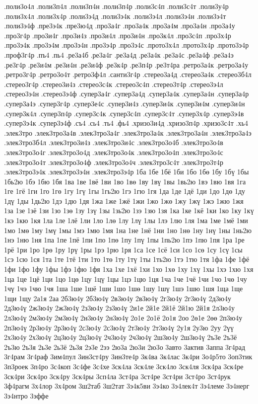 {.поли3о4л
.поли3п4л
.поли3п4н
.поли3п4р
.поли3с4п
.поли3с4т
.поли3у4р
.поли3х4л
.поли3х4р
.поли3э4д
.поли3э4к
.поли3э4л
.поли3э4н
.поли3э4т
.поли3э4ф
.пре3э4к
.пре3ю4д
.про3а4г
.про3а4к
.про3а4м
.про3а4н
.про3а4у
.про3г4р
.про3и4г
.про3и4з
.про3и4л
.про3и4н
.про3к4л
.про3с4п
.про3х4р
.про3э4к
.про3э4м
.про3э4н
.про3э4р
.про3э4с
.прото3х4л
.прото3х4р
.прото3э4р
.проф3г4р
.пъ4
.пь4
.ре3а4б
.ре3а4г
.ре3а4д
.ре3а4к
.ре3а4с
.ре3а4ф
.ре3а4э
.ре3г4р
.ре3и4м
.ре3и4н
.ре3и4ф
.ре3к4р
.ре3п4р
.ре3т4ра
.ретро3а4к
.ретро3а4у
.ретро3г4р
.ретро3о4т
.ретро3ф4л
.санти3г4р
.стерео3а4д
.стерео3а4к
.стерео3б4л
.стерео3г4р
.стерео3и4з
.стерео3с4к
.стерео3с4п
.стерео3т4р
.стерео3э4л
.стерео3э4н
.стерео3э4ф
.супер3а4г
.супер3а4д
.супер3а4к
.супер3а4н
.супер3а4р
.супер3а4э
.супер3г4р
.супер3е4с
.супер3и4з
.супер3и4к
.супер3и4м
.супер3и4н
.супер3к4л
.супер3п4р
.супер3с4к
.супер3с4п
.супер3с4т
.супер3х4р
.супер3э4в
.супер3э4к
.супер3э4ф
.съ4
.сь4
.ть4
.фь4
.хризо3и4д
.хризо3п4р
.хризо3с4т
.хь4
.элек3тро
.элек3тро3а4в
.элек3тро3а4г
.элек3тро3а4к
.элек3тро3а4н
.элек3тро3а4э
.элек3тро3б4л
.элек3тро3и4з
.элек3тро3и4с
.элек3тро3о4б
.элек3тро3о4в
.элек3тро3о4г
.элек3тро3о4д
.элек3тро3о4к
.элек3тро3о4п
.элек3тро3о4с
.элек3тро3о4т
.элек3тро3о4ф
.элек3тро3о4ч
.элек3тро3с4т
.элек3тро3т4р
.элек3тро3э4к
.элек3тро3э4н
.элек3тро3э4р
1ба
1бе
1бё
1би
1бо
1бө
1бу
1бү
1бы
1бь2ю
1бэ
1бю
1бя
1ва
1ве
1вё
1ви
1во
1вө
1ву
1вү
1вы
1вь2ю
1вэ
1вю
1вя
1га
1ге
1гё
1ги
1го
1гө
1гу
1гү
1гы
1гь2ю
1гэ
1гю
1гя
1да
1де
1дё
1ди
1до
1дө
1ду
1дү
1ды
1дь2ю
1дэ
1дю
1дя
1жа
1же
1жё
1жи
1жо
1жө
1жу
1жү
1жэ
1жю
1жя
1за
1зе
1зё
1зи
1зо
1зө
1зу
1зү
1зы
1зь2ю
1зэ
1зю
1зя
1ка
1ке
1кё
1ки
1ко
1ку
1кү
1кэ
1кю
1кя
1ла
1ле
1лё
1ли
1ло
1лө
1лу
1лү
1лы
1лэ
1лю
1ля
1ма
1ме
1мё
1ми
1мо
1мө
1му
1мү
1мы
1мэ
1мю
1мя
1на
1не
1нё
1ни
1но
1нө
1ну
1нү
1ны
1нь2ю
1нэ
1ню
1ня
1па
1пе
1пё
1пи
1по
1пө
1пу
1пү
1пы
1пь2ю
1пэ
1пю
1пя
1ра
1ре
1рё
1ри
1ро
1рө
1ру
1рү
1ры
1рэ
1рю
1ря
1са
1се
1сё
1си
1со
1сө
1су
1сү
1сы
1сэ
1сю
1ся
1та
1те
1тё
1ти
1то
1тө
1ту
1тү
1ты
1ть2ю
1тэ
1тю
1тя
1фа
1фе
1фё
1фи
1фо
1фу
1фы
1фэ
1фю
1фя
1ха
1хе
1хё
1хи
1хо
1хө
1ху
1хү
1хы
1хэ
1хю
1хя
1ца
1це
1цё
1ци
1цо
1цө
1цу
1цү
1цы
1цэ
1цю
1ця
1ча
1че
1чё
1чи
1чо
1чө
1чу
1чү
1чэ
1чю
1чя
1ша
1ше
1шё
1ши
1шо
1шө
1шу
1шү
1шэ
1шю
1шя
1ща
1ще
1щи
1щу
2а1я
2аа
2б3ю4у
2б3ю4ү
2в3ю4у
2в3ю4ү
2г3ю4у
2г3ю4ү
2д3ю4у
2д3ю4ү
2ж3ю4у
2ж3ю4ү
2з3ю4у
2з3ю4ү
2и1е
2й1е
2й1ё
2й1ю
2й1я
2л3ю4у
2л3ю4ү
2м3ю4у
2м3ю4ү
2н3ю4у
2н3ю4ү
2о1е
2о1ё
2о1я
2оо
2ө1е
2өө
2п3ю4у
2п3ю4ү
2р3ю4у
2р3ю4ү
2с3ю4у
2с3ю4ү
2т3ю4у
2т3ю4ү
2у1я
2у3ю
2уу
2үү
2х3ю4у
2х3ю4ү
2ц3ю4у
2ц3ю4ү
2ч3ю4у
2ч3ю4ү
2ш3ю4у
2ш3ю4ү
2ъ3е
2ъ3ё
2ъ3ю
2ъ3я
2ь3е
2ь3ё
2ь3я
2э3е
2ээ
2ю3а
2ю3и
2ю3о
3авто
3актив
3аппа
3г4рад
3г4рам
3г4раф
3им4пул
3ин3ст4ру
3ин3те4р
3к4ва
3к4лас
3к4ри
3о4р5то
3оп3тик
3п3роек
3п4ро
3с4коп
3с4фе
3с4хе
3ск4ла
3ск4ле
3ск4ло
3ск4ля
3ск4ра
3ск4ре
3ск4ри
3ск4ро
3ск4ру
3ск4ры
3сп4ла
3ст4ра
3ст4ре
3ст4ри
3ст4ро
3ст4рук
3ф4рагм
3х4лор
3х4ром
3ш2таб
3ш2тат
3э4к5ви
3э4ко
3э4лек4т
3э4леме
3э4нерг
3э4нтро
3эффе
}
